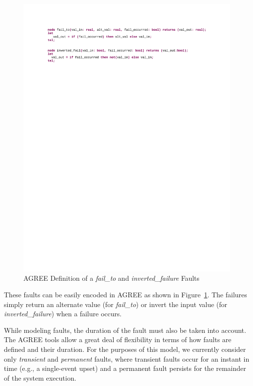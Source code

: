 \begin{figure}[h!]
  \centering
 \includegraphics[trim=70 630 60 20,clip,width=1\textwidth]{images/fail_nodes.pdf}
  \vspace{-0.1in}
  \caption{AGREE Definition of a \textit{fail\_to} and \textit{inverted\_failure} Faults}
  \label{fig:failureNodes}
\end{figure}

These faults can be easily encoded in AGREE as shown in Figure~\ref{fig:failureNodes}.  The failures simply return an alternate value (for {\em fail\_to}) or invert the input value (for {\em inverted\_failure}) when a failure occurs.


While modeling faults, the duration of the fault must also be taken into account.  The AGREE tools allow a great deal of flexibility in terms of how faults are defined and their duration.  For the purposes of this model, we currently consider only {\em transient} and {\em permanent} faults, where transient faults occur for an instant in time (e.g., a single-event upset) and a permanent fault persists for the remainder of the system execution.



